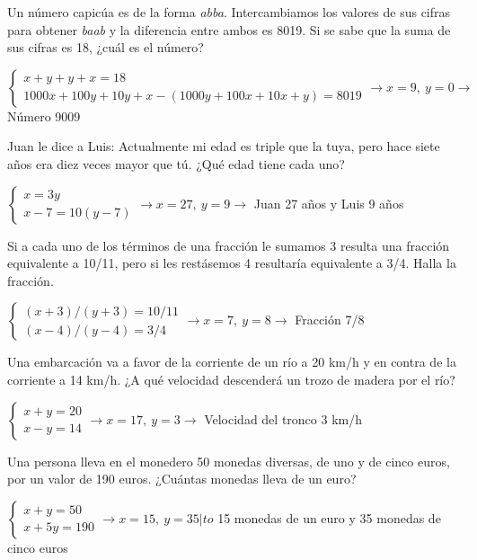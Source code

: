 \documentclass[spanish, 12pt]{exam}
\begin{document}
\begin{questions}
\question Un número capicúa es de la forma \emph{abba}. Intercambiamos los valores de sus cifras para obtener \emph{baab} y la diferencia entre ambos es 8019. Si se sabe que la suma de sus cifras es 18, ¿cuál es el número?
\begin{solution} $\left\{\begin{matrix}x+y+y+x=18 \\ 1000x+100y+10y+x-(1000y+100x+10x+y)=8019\end{matrix}\right. \to  x = 9, \  y = 0 \to$ Número 9009 \end{solution}

\question Juan le dice a Luis: Actualmente mi edad es triple que la tuya, pero hace siete años era diez veces mayor que tú. ¿Qué edad tiene cada uno?

\begin{solution} $\left\{\begin{matrix}x=3y \\ x-7=10(y-7)\end{matrix}\right. \to  x = 27, \  y = 9 \to$ Juan 27 años y Luis 9 años \end{solution}

\question Si a cada uno de los términos de una fracción le sumamos 3 resulta una fracción equivalente a 10/11, pero si les restásemos 4 resultaría equivalente a 3/4. Halla la fracción.
\begin{solution} $\left\{\begin{matrix}(x+3)/(y+3)=10/11 \\ (x-4)/(y-4)=3/4\end{matrix}\right. \to  x = 7, \  y = 8 \to$ Fracción 7/8 \end{solution}

\question Una embarcación va a favor de la corriente de un río a 20 km/h y en contra de la corriente a 14 km/h. ¿A qué velocidad descenderá un trozo de madera por el río?

\begin{solution} $\left\{\begin{matrix}x+y=20 \\ x-y=14\end{matrix}\right. \to  x = 17, \  y = 3 \to$ Velocidad del tronco 3 km/h \end{solution}

\question Una persona lleva en el monedero 50 monedas diversas, de uno y de cinco euros, por un valor de 190 euros. ¿Cuántas monedas lleva de un euro?
\begin{solution} $\left\{\begin{matrix}x+y=50 \\ x+5y=190\end{matrix}\right. \to  x = 15, \  y = 35 |to$ 15 monedas de un euro y 35 monedas de cinco euros \end{solution}


\end{questions}
\end{document}
